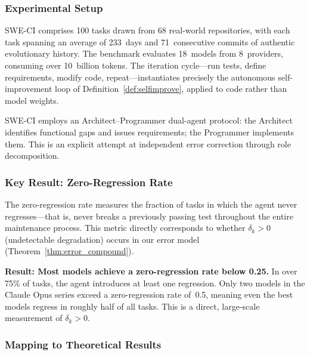\documentclass[11pt,a4paper]{article}
\begin{document}
\subsubsection{Experimental Setup}
SWE-CI comprises 100 tasks drawn from 68 real-world repositories, with each task spanning an average of 233~days and 71~consecutive commits of authentic evolutionary history. The benchmark evaluates 18~models from 8~providers, consuming over 10~billion tokens. The iteration cycle---run tests, define requirements, modify code, repeat---instantiates precisely the autonomous self-improvement loop of Definition~\ref{def:selfimprove}, applied to code rather than model weights.

SWE-CI employs an Architect--Programmer dual-agent protocol: the Architect identifies functional gaps and issues requirements; the Programmer implements them. This is an explicit attempt at independent error correction through role decomposition.

\subsubsection{Key Result: Zero-Regression Rate}
The zero-regression rate measures the fraction of tasks in which the agent never regresses---that is, never breaks a previously passing test throughout the entire maintenance process. This metric directly corresponds to whether $\delta_k > 0$ (undetectable degradation) occurs in our error model (Theorem~\ref{thm:error_compound}).

\textbf{Result: Most models achieve a zero-regression rate below 0.25.} In over 75\% of tasks, the agent introduces at least one regression. Only two models in the Claude Opus series exceed a zero-regression rate of~0.5, meaning even the best models regress in roughly half of all tasks. This is a direct, large-scale measurement of $\delta_k > 0$.

\subsubsection{Mapping to Theoretical Results}
\end{document}
